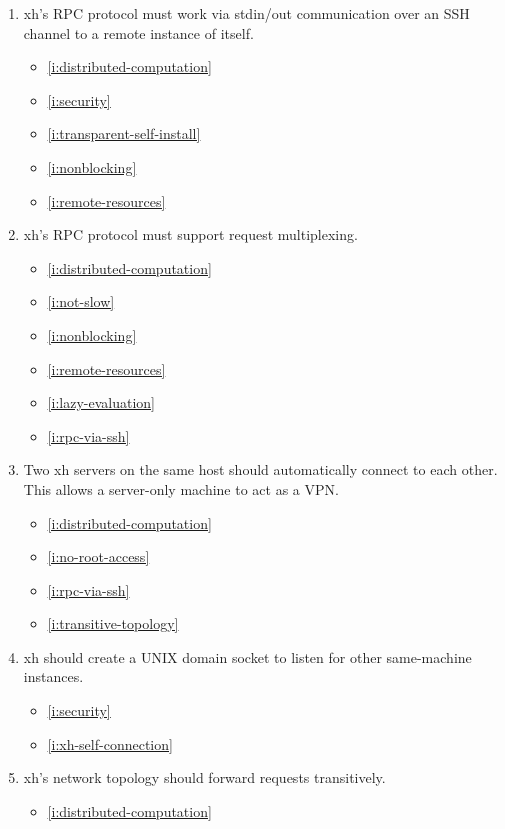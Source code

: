 \documentclass{report}
\makeatletter
\newcommand*{\Label}[2]{%
  \@bsphack
  \begingroup
    \label{#1-original}%
    \def\@currentlabel{#2 [\ref{#1-original}]}%
    \label{#1}%
  \endgroup
  \@esphack
}
\makeatother
\begin{document}
\begin{enumerate}
\item{}\Label{i:rpc-via-ssh}{sshrpc}
  xh's RPC protocol must work via stdin/out communication over an SSH
  channel to a remote instance of itself.
\begin{itemize}
\item \ref{i:distributed-computation}
\item \ref{i:security}
\item \ref{i:transparent-self-install}
\item \ref{i:nonblocking}
\item \ref{i:remote-resources}
\end{itemize}
\item{}\Label{i:rpc-multiplexing}{rpcmulti}
  xh's RPC protocol must support request multiplexing.
\begin{itemize}
\item \ref{i:distributed-computation}
\item \ref{i:not-slow}
\item \ref{i:nonblocking}
\item \ref{i:remote-resources}
\item \ref{i:lazy-evaluation}
\item \ref{i:rpc-via-ssh}
\end{itemize}
\item{}\Label{i:xh-self-connection}{hostswitch}
  Two xh servers on the same host should automatically connect to each
  other. This allows a server-only machine to act as a VPN.
\begin{itemize}
\item \ref{i:distributed-computation}
\item \ref{i:no-root-access}
\item \ref{i:rpc-via-ssh}
\item \ref{i:transitive-topology}
\end{itemize}
\item{}\Label{i:domain-sockets}{domainsockets}
  xh should create a UNIX domain socket to listen for other same-machine
  instances.
\begin{itemize}
\item \ref{i:security}
\item \ref{i:xh-self-connection}
\end{itemize}
\item{}\Label{i:transitive-topology}{transitive}
  xh's network topology should forward requests transitively.
\begin{itemize}
\item \ref{i:distributed-computation}

\end{itemize}
\end{enumerate}
\end{document}
